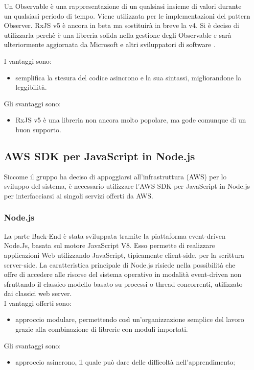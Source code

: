Un Observable è una rappresentazione di un qualsiasi insieme di valori durante un qualsiasi periodo di tempo. Viene utilizzata per le implementazioni del pattern Observer.
RxJS v5 è ancora in beta ma sostituirà in breve la v4. Si è deciso di utilizzarla perchè è una libreria solida nella gestione degli Observable e sarà ulteriormente aggiornata
da Microsoft e altri sviluppatori di software .

I vantaggi sono:
\begin{itemize}
	\item semplifica la stesura del codice asincrono e la sua sintassi, migliorandone la leggibilità.
\end{itemize}
Gli svantaggi sono:
\begin{itemize}
	\item RxJS v5 è una libreria non ancora molto popolare, ma gode comunque di un buon supporto.
\end{itemize}

\subsection{AWS SDK per JavaScript in Node.js}

Siccome il gruppo ha deciso di appoggiarsi all'infrastruttura  (AWS) per lo sviluppo del sistema, è necessario utilizzare l'AWS SDK per JavaScript in Node.js per
interfacciarsi ai singoli servizi offerti da AWS.

\subsubsection{Node.js}
La parte Back-End è stata sviluppata tramite la piattaforma event-driven Node.Js, basata sul motore JavaScript V8. Esso permette di realizzare applicazioni Web utilizzando JavaScript, tipicamente client-side, per la scrittura server-side. La caratteristica principale di Node.js risiede nella possibilità che offre di accedere alle risorse del sistema operativo in modalità event-driven non sfruttando il classico modello basato su processi o thread concorrenti, utilizzato dai classici web server.\\
I vantaggi offerti sono:
\begin{itemize}
	\item approccio modulare, permettendo così un’organizzazione semplice del lavoro grazie alla combinazione di librerie con moduli importati.
\end{itemize}
Gli svantaggi sono:
\begin{itemize}
	\item approccio asincrono, il quale può dare delle difficoltà nell'apprendimento;
\end{itemize}

